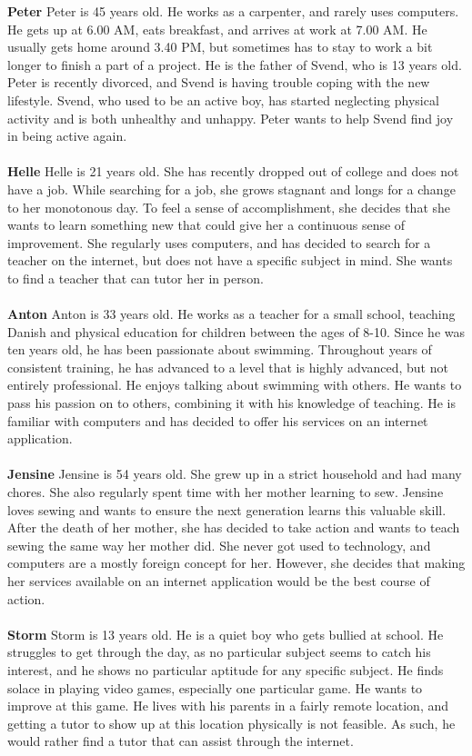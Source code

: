 \textbf{Peter}
Peter is 45 years old.
He works as a carpenter, and rarely uses computers.
He gets up at 6.00 AM, eats breakfast, and arrives at work at 7.00 AM.
He usually gets home around 3.40 PM, but sometimes has to stay to work a bit longer to finish a part of a project.
He is the father of Svend, who is 13 years old.
Peter is recently divorced, and Svend is having trouble coping with the new lifestyle.
Svend, who used to be an active boy, has started neglecting physical activity and is both unhealthy and unhappy.
Peter wants to help Svend find joy in being active again. 
\\\\
\textbf{Helle}
Helle is 21 years old.
She has recently dropped out of college and does not have a job.
While searching for a job, she grows stagnant and longs for a change to her monotonous day.
To feel a sense of accomplishment, she decides that she wants to learn something new that could give her a continuous sense of improvement.
She regularly uses computers, and has decided to search for a teacher on the internet, but does not have a specific subject in mind.
She wants to find a teacher that can tutor her in person.
\\\\
\textbf{Anton}
Anton is 33 years old.
He works as a teacher for a small school, teaching Danish and physical education for children between the ages of 8-10.
Since he was ten years old, he has been passionate about swimming.
Throughout years of consistent training, he has advanced to a level that is highly advanced, but not entirely professional.
He enjoys talking about swimming with others.
He wants to pass his passion on to others, combining it with his knowledge of teaching.
He is familiar with computers and has decided to offer his services on an internet application.
\\\\
\textbf{Jensine}
Jensine is 54 years old.
She grew up in a strict household and had many chores.
She also regularly spent time with her mother learning to sew.
Jensine loves sewing and wants to ensure the next generation learns this valuable skill.
After the death of her mother, she has decided to take action and wants to teach sewing the same way her mother did.
She never got used to technology, and computers are a mostly foreign concept for her.
However, she decides that making her services available on an internet application would be the best course of action.
\\\\
\textbf{Storm}
Storm is 13 years old.
He is a quiet boy who gets bullied at school. 
He struggles to get through the day, as no particular subject seems to catch his interest, and he shows no particular aptitude for any specific subject.
He finds solace in playing video games, especially one particular game. 
He wants to improve at this game.
He lives with his parents in a fairly remote location, and getting a tutor to show up at this location physically is not feasible.
As such, he would rather find a tutor that can assist through the internet.
